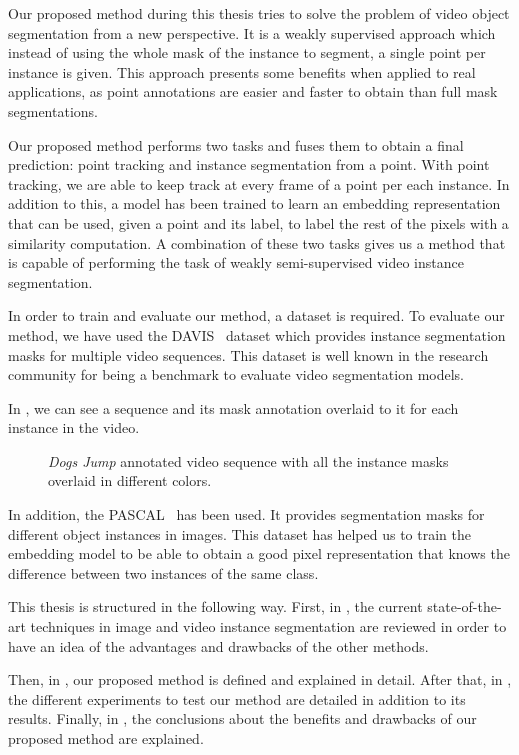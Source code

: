 Our proposed method during this thesis tries to solve the problem of video object segmentation from a new perspective.
It is a weakly supervised approach which instead of using the whole mask of the instance to segment, a single point per instance is given.
This approach presents some benefits when applied to real applications, as point annotations are easier and faster to obtain than full mask segmentations.


Our proposed method performs two tasks and fuses them to obtain a final prediction: point tracking and instance segmentation from a point.
With point tracking, we are able to keep track at every frame of a point per each instance.
In addition to this, a model has been trained to learn an embedding representation that can be used, given a point and its label, to label the rest of the pixels with a similarity computation.
A combination of these two tasks gives us a method that is capable of performing the task of weakly semi-supervised video instance segmentation.

In order to train and evaluate our method, a dataset is required.
To evaluate our method, we have used the DAVIS~\davisboth{} dataset which provides instance segmentation masks for multiple video sequences.
This dataset is well known in the research community for being a benchmark to evaluate video segmentation models.

In , we can see a sequence and its mask annotation overlaid to it for each instance in the video.

\begin{figure}[h]
  \centering
  \caption{\textit{Dogs Jump} annotated video sequence with all the instance masks overlaid in different colors. }
  \label{fig:intro:davis}
\end{figure}

In addition, the PASCAL~\pascal{} has been used.
It provides segmentation masks for different object instances in images.
This dataset has helped us to train the embedding model to be able to obtain a good pixel representation that knows the difference between two instances of the same class.

This thesis is structured in the following way. First, in , the current state-of-the-art techniques in image and video instance segmentation are reviewed in order to have an idea of the advantages and drawbacks of the other methods.

Then, in , our proposed method is defined and explained in detail.
After that, in , the different experiments to test our method are detailed in addition to its results.
Finally, in , the conclusions about the benefits and drawbacks of our proposed method are explained.
